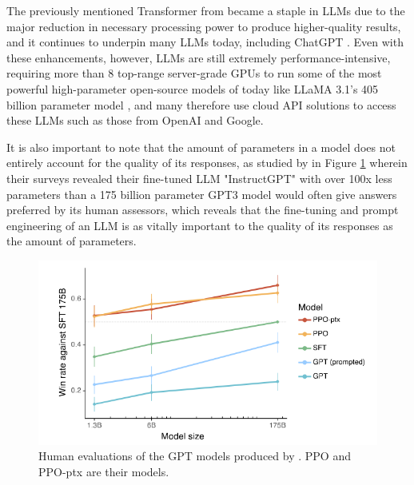 \documentclass[12pt]{report}
\begin{document}
    The previously mentioned Transformer from \textcite{vaswani_attention_2017} 
    became a staple in LLMs due to the major reduction in necessary processing power to produce higher-quality 
    results, and it continues to underpin many LLMs today, including ChatGPT \autocite{brown_language_2020}. 
    Even with these enhancements, however, LLMs are still extremely performance-intensive,
    requiring more than 8 top-range server-grade GPUs to run some of the most powerful high-parameter open-source models of today like LLaMA 3.1's 405 billion parameter model \autocite{dubey_llama_2024},
    and many therefore use cloud API solutions to access these LLMs such as those from OpenAI and Google.
    
    
    It is also important to note that the amount of parameters in a model does not entirely account for the quality of its responses, as studied by \textcite{ouyang_training_2022}
    in Figure \ref{fig:LLMPref} wherein their surveys revealed their fine-tuned LLM "InstructGPT" with over 100x less parameters than a 175 billion parameter 
    GPT3 model would often give answers preferred by its human assessors, which reveals that the fine-tuning and prompt engineering of an LLM is as vitally important
    to the quality of its responses as the amount of parameters.  
    

    \begin{figure}[H] 
        \centering
        \includegraphics[width=.85\linewidth]{ouyangLLMPreference.png}
        \caption{Human evaluations of the GPT models produced by \textcite{ouyang_training_2022}. PPO and PPO-ptx are their models.}
        \label{fig:LLMPref}
    \end{figure}
\end{document}
